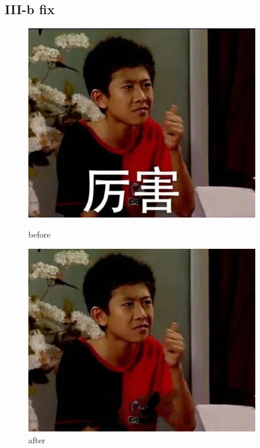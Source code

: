 \documentclass[twoside,a4paper]{article}
\begin{document}
\subsection*{III-b fix}
\begin{figure}[H]
\centering
\includegraphics[width=4in]{before.jpg}
\caption{before}
\includegraphics[width=4in]{after.jpg}
\caption{after}
\end{figure}
\end{document}
